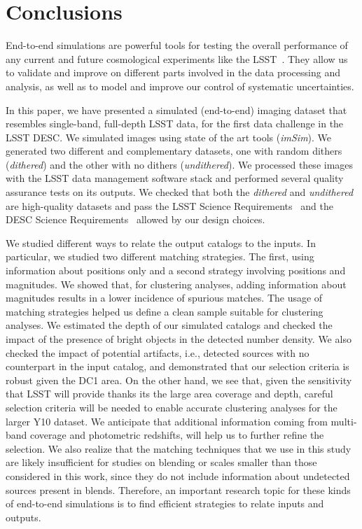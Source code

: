 \documentclass[twocolumn]{aastex62}
\begin{document}

\section{Conclusions}
\label{sec:conclusions}

End-to-end simulations are powerful tools for testing the overall performance of any current and future cosmological experiments like the LSST~\citep{Overview}. They allow us to validate and improve on different parts involved in the data processing and analysis, as well as to model and improve our control of systematic uncertainties.

In this paper, we have presented a simulated (end-to-end) imaging dataset that resembles single-band, full-depth LSST data, for the first data challenge in the LSST DESC. We simulated images using state of the art tools (\textit{imSim}). We generated two different and complementary datasets, one with random dithers (\textit{dithered}) and the other with no dithers (\textit{undithered}). We processed these images with the LSST data management software stack and performed several quality assurance tests on its outputs. We checked that both the \textit{dithered} and \textit{undithered} are high-quality datasets and pass the LSST Science Requirements~\citep{LPM-17} and the DESC Science Requirements~\citep{2018arXiv180901669T} allowed by our design choices.

We studied different ways to relate the output catalogs to the inputs. In particular, we studied two different matching strategies. The first, using information about positions only and a second strategy involving positions and magnitudes. We showed that, for clustering analyses, adding information about magnitudes results in a lower incidence of spurious matches. The usage of matching strategies helped us define a clean sample suitable for clustering analyses. We estimated the depth of our simulated catalogs and checked the impact of the presence of bright objects in the detected number density. We also checked the impact of potential artifacts, i.e., detected sources with no counterpart in the input catalog, and demonstrated that our selection criteria is robust given the DC1 area. On the other hand, we see that, given the sensitivity that LSST will provide thanks its the large area coverage and depth, careful selection criteria will be needed to enable accurate clustering analyses for the larger Y10 dataset. We anticipate that additional information coming from multi-band coverage and photometric redshifts, will help us to further refine the selection. We also realize that the matching techniques that we use in this study are likely insufficient for studies on blending or scales smaller than those considered in this work, since they do not include information about undetected sources present in blends. Therefore, an important research topic for these kinds of end-to-end simulations is to find efficient strategies to relate inputs and outputs.
\end{document}
